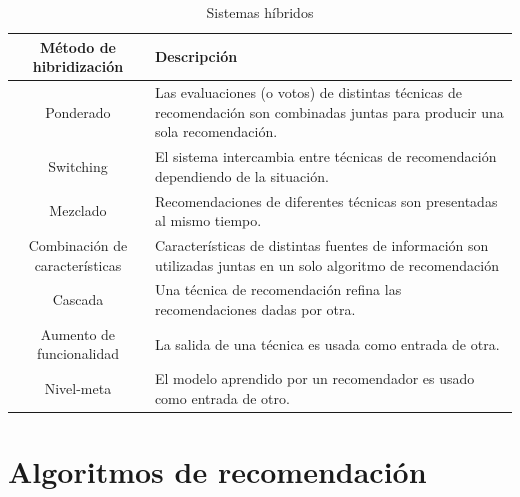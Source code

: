 \clearpage
\begin{table}[h]
	\begin{center}
		\begin{tabular}{| c | p{10cm} |}
			\toprule
			\textbf{Método de hibridización} & \textbf{Descripción}                                                                                                            \\
			\midrule
			Ponderado                          & Las evaluaciones (o votos) de distintas técnicas de recomendación son combinadas juntas para producir una sola recomendación. \\
			\midrule
			Switching                          & El sistema intercambia entre técnicas de recomendación dependiendo de la situación.                                           \\
			\midrule
			Mezclado                           & Recomendaciones de diferentes técnicas son presentadas al mismo tiempo.                                                         \\
			\midrule
			Combinación de características   & Características de distintas fuentes de información son utilizadas juntas en un solo algoritmo de recomendación               \\
			\midrule
			Cascada                            & Una técnica de recomendación refina las recomendaciones dadas por otra.                                                        \\
			\midrule
			Aumento de funcionalidad           & La salida de una técnica es usada como entrada de otra.                                                                         \\
			\midrule
			Nivel-meta                         & El modelo aprendido por un recomendador es usado como entrada de otro.                                                           \\
			\bottomrule
		\end{tabular}
		\caption{Sistemas híbridos}
		\label{table: sistemas hibridos}\cite{5}
	\end{center}
\end{table}

\newpage
\section{Algoritmos de recomendación}

